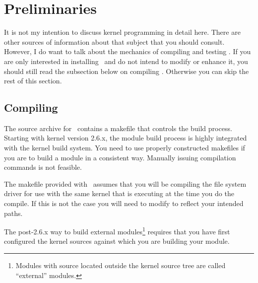 %
%
%
%

\section{Preliminaries}
\label{sec:preliminaries}

It is not my intention to discuss kernel programming in detail here. There are other sources of
information about that subject that you should consult. However, I do want to talk about the
mechanics of compiling and testing \GenericFS. If you are only interested in installing
\GenericFS\ and do not intend to modify or enhance it, you should still read the subsection
below on compiling \GenericFS. Otherwise you can skip the rest of this section.

\subsection{Compiling \GenericFS}
\label{sec:compiling}

The source archive for \GenericFS\ contains a makefile that controls the build process. Starting
with kernel version 2.6.x, the module build process is highly integrated with the kernel build
system. You need to use properly constructed makefiles if you are to build a module in a
consistent way. Manually issuing compilation commands is not feasible.

The makefile provided with \GenericFS\ assumes that you will be compiling the file system driver
for use with the same kernel that is executing at the time you do the compile. If this is not
the case you will need to modify  to reflect your intended paths.

The post-2.6.x way to build external modules\footnote{Modules with source located outside the
  kernel source tree are called ``external'' modules.} requires that you have first configured
the kernel sources against which you are building your module.


